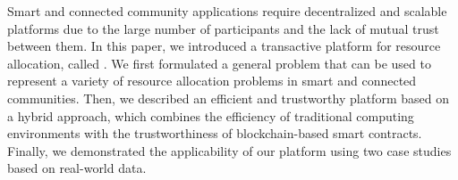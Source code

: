 


Smart and connected community applications require decentralized and scalable platforms due to the large number of participants and the lack of mutual trust between them. In this paper,  we introduced a transactive platform for resource allocation, called \Platform. We first formulated a general problem that can be used to represent a variety of resource allocation problems in smart and connected communities. Then, we described an efficient and trustworthy platform based on a hybrid approach, which combines the efficiency of traditional computing environments with the trustworthiness of blockchain-based smart contracts. Finally, we demonstrated the applicability of our platform using two case studies based on real-world data.

